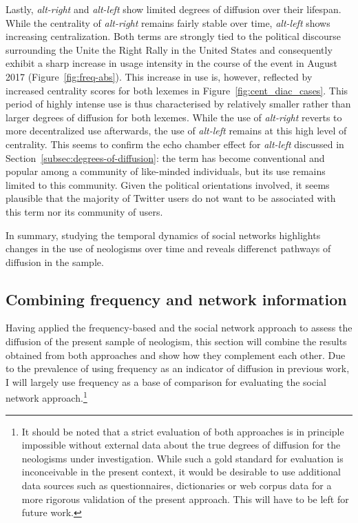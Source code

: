 \documentclass[
  a4paper,
  abstract=on,
  captions=tableabove,
  ]{scrartcl}
\newcommand{\ol}[1]{\emph{#1}}
\begin{document}
      Lastly, \ol{alt-right} and \ol{alt-left} show limited degrees of diffusion over their lifespan. While the centrality of \ol{alt-right} remains fairly stable over time, \ol{alt-left} shows increasing centralization. Both terms are strongly tied to the political discourse surrounding the Unite the Right Rally in the United States and consequently exhibit a sharp increase in usage intensity in the course of the event in August 2017 (Figure~\ref{fig:freq-abs}). This increase in use is, however, reflected by increased centrality scores for both lexemes in Figure~\ref{fig:cent_diac_cases}. This period of highly intense use is thus characterised by relatively smaller rather than larger degrees of diffusion for both lexemes. While the use of \ol{alt-right} reverts to more decentralized use afterwards, the use of \ol{alt-left} remains at this high level of centrality. This seems to confirm the echo chamber effect for \ol{alt-left} discussed in Section~\ref{subsec:degrees-of-diffusion}: the term has become conventional and popular among a community of like-minded individuals, but its use remains limited to this community. Given the political orientations involved, it seems plausible that the majority of Twitter users do not want to be associated with this term nor its community of users.  

      In summary, studying the temporal dynamics of social networks highlights changes in the use of neologisms over time and reveals differenct pathways of diffusion in the sample.


  \subsection{Combining frequency and network information}
    \label{subsec:nets-vs-freq}

    Having applied the frequency-based and the social network approach to assess the diffusion of the present sample of neologism, this section will combine the results obtained from both approaches and show how they complement each other. Due to the prevalence of using frequency as an indicator of diffusion in previous work, I will largely use frequency as a base of comparison for evaluating the social network approach.\footnote{It should be noted that a strict evaluation of both approaches is in principle impossible without external data about the true degrees of diffusion for the neologisms under investigation. While such a gold standard for evaluation is inconceivable in the present context, it would be desirable to use additional data sources such as questionnaires, dictionaries or web corpus data for a more rigorous validation of the present approach. This will have to be left for future work.}
\end{document}

